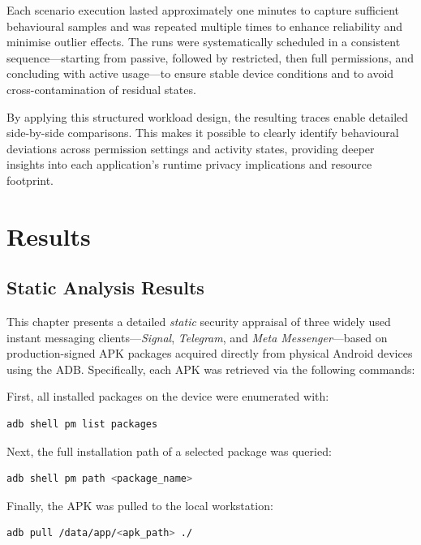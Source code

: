 \documentclass[a4paper,12pt]{report}
\begin{document}
Each scenario execution lasted approximately one minutes to capture sufficient behavioural samples and was repeated multiple times to enhance reliability and minimise outlier effects. The runs were systematically scheduled in a consistent sequence—starting from passive, followed by restricted, then full permissions, and concluding with active usage—to ensure stable device conditions and to avoid cross-contamination of residual states.

By applying this structured workload design, the resulting traces enable detailed side-by-side comparisons. This makes it possible to clearly identify behavioural deviations across permission settings and activity states, providing deeper insights into each application's runtime privacy implications and resource footprint.


\chapter{Results}

\section{Static Analysis Results}

This chapter presents a detailed \emph{static} security appraisal of three widely used instant messaging clients—\textit{Signal}, \textit{Telegram}, and \textit{Meta Messenger}—based on production-signed APK packages acquired directly from physical Android devices using the ADB. Specifically, each APK was retrieved via the following commands:

First, all installed packages on the device were enumerated with:
\begin{lstlisting}[language=bash]
adb shell pm list packages
\end{lstlisting}

Next, the full installation path of a selected package was queried:
\begin{lstlisting}[language=bash]
adb shell pm path <package_name>
\end{lstlisting}

Finally, the APK was pulled to the local workstation:
\begin{lstlisting}[language=bash]
adb pull /data/app/<apk_path> ./
\end{lstlisting}
\end{document}
